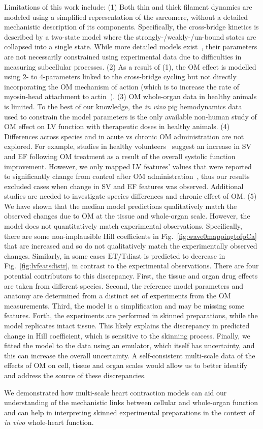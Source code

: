 Limitations of this work include: (1) Both thin and thick filament dynamics are modeled using a simplified representation of the sarcomere, without a detailed mechanistic description of its components. Specifically, the cross-bridge kinetics is described by a two-state model where the strongly-/weakly-/un-bound states are collapsed into a single state. While more detailed models exist~\cite{Land:2015}, their parameters are not necessarily constrained using experimental data due to difficulties in measuring subcellular processes. (2) As a result of (1), the OM effect is modelled using $2$- to $4$-parameters linked to the cross-bridge cycling but not directly incorporating the OM mechanism of action (which is to increase the rate of myosin-head attachment to actin~\cite{Malik:2011}). (3) OM whole-organ data in healthy animals is limited. To the best of our knowledge, the \textit{in vivo} pig hemodynamics data~\cite{Bakkehaug:2015} used to constrain the model parameters is the only available non-human study of OM effect on LV function with therapeutic doses in healthy animals. (4) Differences across species and in acute vs chronic OM administration are not explored. For example, studies in healthy volunteers~\cite{Teerlink:2011} suggest an increase in SV and EF following OM treatment as a result of the overall systolic function improvement. However, we only mapped LV features' values that were reported to significantly change from control after OM administration~\cite{Bakkehaug:2015}, thus our results excluded cases when change in SV and EF features was observed. Additional studies are needed to investigate species differences and chronic effect of OM. (5) We have shown that the median model predictions qualitatively match the observed changes due to OM at the tissue and whole-organ scale. However, the model does not quantitatively match experimental observations. Specifically, there are some non-implausible Hill coefficients in Fig.~\ref{fig:wave0mappingtofpCa} that are increased and so do not qualitatively match the experimentally observed changes. Similarly, in some cases $\textrm{ET}/\textrm{Tdiast}$ is predicted to decrease in Fig.~\ref{fig:lvfeatsdistr}, in contrast to the experimental observations. There are four potential contributors to this discrepancy. First, the tissue and organ drug effects are taken from different species. Second, the reference model parameters and anatomy are determined from a distinct set of experiments from the OM measurements. Third, the model is a simplification and may be missing some features. Forth, the experiments are performed in skinned preparations, while the model replicates intact tissue. This likely explains the discrepancy in predicted change in Hill coefficient, which is sensitive to the skinning process. Finally, we fitted the model to the data using an emulator, which itself has uncertainty, and this can increase the overall uncertainty. A self-consistent multi-scale data of the effects of OM on cell, tissue and organ scales would allow us to better identify and address the source of these discrepancies.

\vspace{0.2cm}
We demonstrated how multi-scale heart contraction models can aid our understanding of the mechanistic links between cellular and whole-organ function and can help in interpreting skinned experimental preparations in the context of \textit{in vivo} whole-heart function.